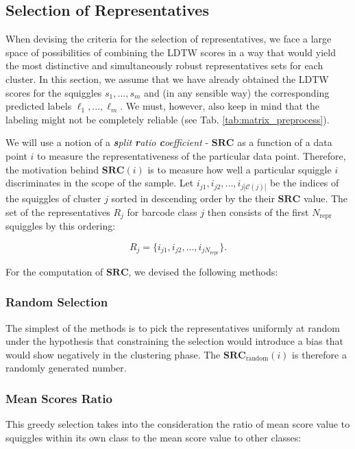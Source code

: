 \subsection{Selection of Representatives}
When devising the criteria for the selection of representatives, we face a large space of possibilities of combining the LDTW scores in a way that would yield the most distinctive and simultaneously robust representatives sets for each cluster. In this section, we assume that we have already obtained the LDTW scores for the squiggles $s_1, ..., s_m$ and (in any sensible way) the corresponding predicted labels $\ell_1, ..., \ell_m$. We must, however, also keep in mind that the labeling might not be completely reliable (see Tab. \ref{tab:matrix_preprocess}).

We will use a notion of a \textit{\textbf{s}plit \textbf{r}atio \textbf{c}oefficient} - $\textbf{SRC}$ as a function of a data point $i$ to measure the representativeness of the particular data point. Therefore, the motivation behind $\textbf{SRC}(i)$ is to measure how well a particular squiggle $i$ discriminates in the scope of the sample. Let $i_{j1}, i_{j2}, ..., i_{j |\mathcal{C}(j)|}$ be the indices of the squiggles of cluster $j$ sorted in descending order by the their $\textbf{SRC}$ value. The set of the representatives $R_j$ for barcode class $j$ then consists of the first $N_{\text{repr}}$ squiggles by this ordering:

\begin{equation}
    R_j = \{ i_{j1}, i_{j2}, ..., i_{jN_{\text{repr}}} \} .
\end{equation}

For the computation of $\textbf{SRC}$, we devised the following methods:

\subsubsection{Random Selection}
The simplest of the methods is to pick the representatives uniformly at random under the hypothesis that constraining the selection would introduce a bias that would show negatively in the clustering phase. The $\textbf{SRC}_{\text{random}}(i)$ is therefore a randomly generated number.

\subsubsection{Mean Scores Ratio}
This greedy selection takes into the consideration the ratio of mean score value to squiggles within its own class to the mean score value to other classes:

